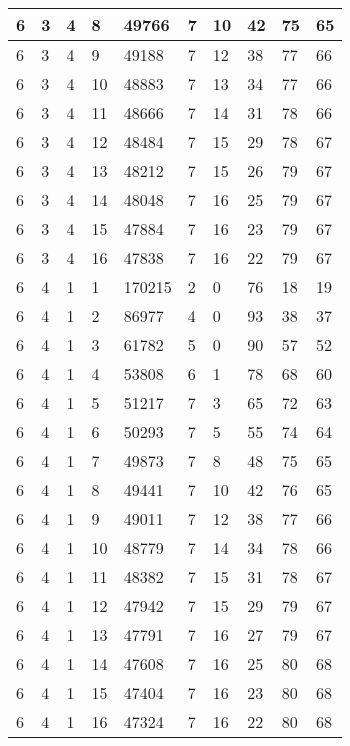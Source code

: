 \begin{table}[!ht]
\begin{tabular}{|l|l|l|l|l|l|l|l|l|l|}
        6 & 3 & 4 & 8 & 49766 & 7 & 10 & 42 & 75 & 65 \\ \hline
        6 & 3 & 4 & 9 & 49188 & 7 & 12 & 38 & 77 & 66 \\ \hline
        6 & 3 & 4 & 10 & 48883 & 7 & 13 & 34 & 77 & 66 \\ \hline
        6 & 3 & 4 & 11 & 48666 & 7 & 14 & 31 & 78 & 66 \\ \hline
        6 & 3 & 4 & 12 & 48484 & 7 & 15 & 29 & 78 & 67 \\ \hline
        6 & 3 & 4 & 13 & 48212 & 7 & 15 & 26 & 79 & 67 \\ \hline
        6 & 3 & 4 & 14 & 48048 & 7 & 16 & 25 & 79 & 67 \\ \hline
        6 & 3 & 4 & 15 & 47884 & 7 & 16 & 23 & 79 & 67 \\ \hline
        6 & 3 & 4 & 16 & 47838 & 7 & 16 & 22 & 79 & 67 \\ \hline
        6 & 4 & 1 & 1 & 170215 & 2 & 0 & 76 & 18 & 19 \\ \hline
        6 & 4 & 1 & 2 & 86977 & 4 & 0 & 93 & 38 & 37 \\ \hline
        6 & 4 & 1 & 3 & 61782 & 5 & 0 & 90 & 57 & 52 \\ \hline
        6 & 4 & 1 & 4 & 53808 & 6 & 1 & 78 & 68 & 60 \\ \hline
        6 & 4 & 1 & 5 & 51217 & 7 & 3 & 65 & 72 & 63 \\ \hline
        6 & 4 & 1 & 6 & 50293 & 7 & 5 & 55 & 74 & 64 \\ \hline
        6 & 4 & 1 & 7 & 49873 & 7 & 8 & 48 & 75 & 65 \\ \hline
        6 & 4 & 1 & 8 & 49441 & 7 & 10 & 42 & 76 & 65 \\ \hline
        6 & 4 & 1 & 9 & 49011 & 7 & 12 & 38 & 77 & 66 \\ \hline
        6 & 4 & 1 & 10 & 48779 & 7 & 14 & 34 & 78 & 66 \\ \hline
        6 & 4 & 1 & 11 & 48382 & 7 & 15 & 31 & 78 & 67 \\ \hline
        6 & 4 & 1 & 12 & 47942 & 7 & 15 & 29 & 79 & 67 \\ \hline
        6 & 4 & 1 & 13 & 47791 & 7 & 16 & 27 & 79 & 67 \\ \hline
        6 & 4 & 1 & 14 & 47608 & 7 & 16 & 25 & 80 & 68 \\ \hline
        6 & 4 & 1 & 15 & 47404 & 7 & 16 & 23 & 80 & 68 \\ \hline
        6 & 4 & 1 & 16 & 47324 & 7 & 16 & 22 & 80 & 68 \\ \hline

\end{tabular}
\end{table}
